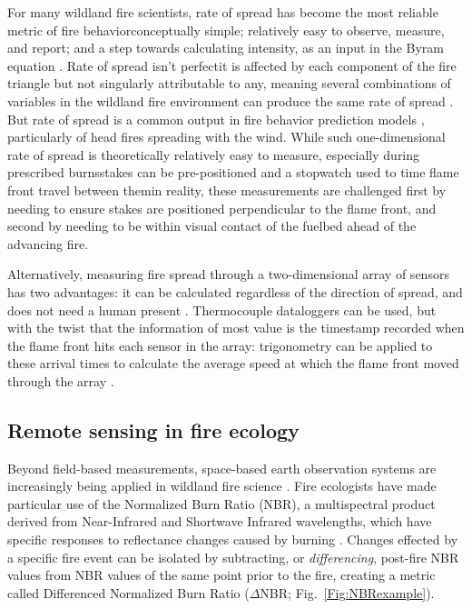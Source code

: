 \documentclass[fire,article,submit,oneauthor,pdftex]{Definitions/mdpi}
\begin{document}
For many wildland fire scientists, rate of spread has become the most reliable metric of fire behavior\textemdash conceptually simple; relatively easy to observe, measure, and report; and a step towards calculating intensity, as an input in the Byram equation \cite{byram1959}. 
Rate of spread isn't perfect\textemdash it is affected by each component of the fire triangle but not singularly attributable to any, meaning several combinations of variables in the wildland fire environment can produce the same rate of spread \cite{finney2021}. 
But rate of spread is a common output in fire behavior prediction models \cite{perry1998, cruz2018}, particularly of head fires spreading with the wind. 
While such one-dimensional rate of spread is theoretically relatively easy to measure, especially during prescribed burns\textemdash stakes can be pre-positioned and a stopwatch used to time flame front travel between them\textemdash in reality, these measurements are challenged first by needing to ensure stakes are positioned perpendicular to the flame front, and second by needing to be within visual contact of the fuelbed ahead of the advancing fire.

Alternatively, measuring fire spread through a two-dimensional array of sensors has two advantages: it can be calculated regardless of the direction of spread, and does not need a human present \cite{finney2021}.
Thermocouple dataloggers can be used, but with the twist that the information of most value is the timestamp recorded when the flame front hits each sensor in the array: trigonometry can be applied to these arrival times to calculate the average speed at which the flame front moved through the array \cite[][Fig.~\ref{Fig:FeatherFlame}]{simard1982, simard1984, clements2019, mcgranahan2021, mcgranahan2023}. 

\subsection{Remote sensing in fire ecology} 

Beyond field-based measurements, space-based earth observation systems are increasingly being applied in wildland fire science \cite{szpakowski2019}. 
Fire ecologists have made particular use of the Normalized Burn Ratio (NBR), a multispectral product derived from Near-Infrared and Shortwave Infrared wavelengths, which have specific responses to reflectance changes caused by burning \cite{key2006a}. 
Changes effected by a specific fire event can be isolated by subtracting, or \emph{differencing}, post-fire NBR values from NBR values of the same point prior to the fire, creating a metric called Differenced Normalized Burn Ratio ($\Delta$NBR; Fig.~\ref{Fig:NBRexample}). 
\end{document}
